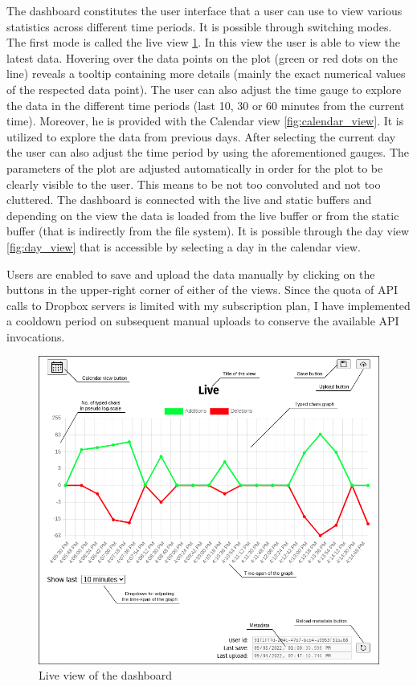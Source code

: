 The dashboard constitutes the user interface that a user can use to view various statistics across different time periods. It is possible through switching modes. The first mode is called the live view \ref{fig:live_view}. In this view the user is able to view the latest data. Hovering over the data points on the plot (green or red dots on the line) reveals a tooltip containing more details (mainly the exact numerical values of the respected data point). The user can also adjust the time gauge to explore the data in the different time periods (last 10, 30 or 60 minutes from the current time). Moreover, he is provided with the Calendar view \ref{fig:calendar_view}. It is utilized to explore the data from previous days. After selecting the current day the user can also adjust the time period by using the aforementioned gauges. The parameters of the plot are adjusted automatically in order for the plot to be clearly visible to the user. This means to be not too convoluted and not too cluttered. The dashboard is connected with the live and static buffers and depending on the view the data is loaded from the live buffer or from the static buffer (that is indirectly from the file system). It is possible through the day view \ref{fig:day_view} that is accessible by selecting a day in the calendar view.

Users are enabled to save and upload the data manually by clicking on the buttons in the upper-right corner of either of the views. Since the quota of API calls to Dropbox servers is limited with my subscription plan, I have implemented a cooldown period on subsequent manual uploads to conserve the available API invocations.

\begin{figure}[htbp]
  \centering
  \includegraphics[scale=0.4]{chapters/methodology/graphics/live-view.png}
  \caption{Live view of the dashboard}
  \label{fig:live_view}
\end{figure}

